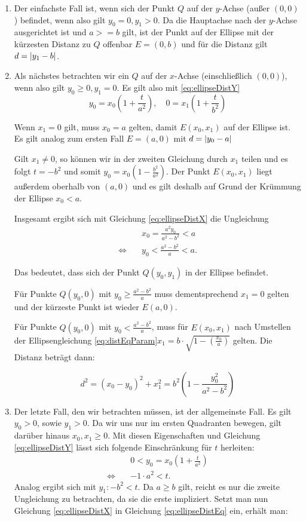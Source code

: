 \begin{enumerate}
	\item Der einfachste Fall ist, wenn sich der Punkt $Q$ auf der $y$-Achse (außer $(0,0)$) befindet, wenn also gilt $y_0 = 0, y_1 > 0$.
	Da die Hauptachse nach der $y$-Achse ausgerichtet ist und $a >= b$ gilt, ist der Punkt auf der Ellipse mit der kürzesten Distanz zu $Q$ offenbar $E = (0, b)$ und für die Distanz gilt $d = \lvert y_1 - b\rvert$.
	\item Als nächstes betrachten wir ein $Q$ auf der $x$-Achse (einschließlich $(0,0)$), wenn also gilt  $y_0 \geq 0, y_1 = 0$. Es gilt also mit \ref{eq:ellipseDistY}
	\[
		y_0 = x_0\left(1 + \frac{t}{a^2}\right), \quad 0 = x_1\left(1 + \frac{t}{b^2}\right)
	\]

	Wenn $x_1 = 0$ gilt, muss $x_0 = a$ gelten, damit $E(x_0,x_1)$ auf der Ellipse ist. Es  gilt analog zum ersten Fall $E=(a,0)$ mit $d = \lvert y_0 - a\rvert$

	Gilt $x_1 \neq 0$, so können wir in der zweiten Gleichung durch $x_1$ teilen und es folgt $t = -b^2$ und somit $y_0 = x_0\left(1 - \frac{b^2}{a^2}\right)$. Der Punkt $E(x_0,x_1)$ liegt außerdem oberhalb von $(a,0)$ und es gilt deshalb auf Grund der Krümmung der Ellipse $x_0 < a$.

	Insgesamt ergibt sich mit Gleichung \ref{eq:ellipseDistX} die Ungleichung
	\[
	\begin{aligned}
		&x_0 = \frac{a^2y_0}{a^2 - b^2} < a \\
		\Leftrightarrow\quad &y_0 < \frac{a^2 - b^2}{a} < a.
	\end{aligned}
	\]

	Das bedeutet, dass sich der Punkt $Q(y_0,y_1)$ in der Ellipse befindet.

	Für Punkte $Q(y_0,0)$ mit $y_0 \geq \frac{a^2 - b^2}{a}$ muss dementsprechend $x_1 = 0$ gelten und der kürzeste Punkt ist wieder $E(a,0)$.

	Für Punkte $Q(y_0,0)$ mit $y_0 < \frac{a^2 - b^2}{a}$, muss für $E(x_0,x_1)$ nach Umstellen der Ellipsengleichung \ref{eq:distEqParam}\quad$x_1 = b\cdot\sqrt{1-\left(\frac{x_0}{a}\right)}$ gelten.
	Die Distanz beträgt dann:

	\[
		d^2 = (x_0 - y_0)^2 + x_1^2 = b^2\left(1 - \frac{y_0^2}{a^2 - b^2}\right)
	\]
	\item Der letzte Fall, den wir betrachten müssen, ist der allgemeinste Fall. Es gilt $y_0 > 0$, sowie $y_1 > 0$. Da wir uns nur im ersten Quadranten bewegen, gilt darüber hinaus $x_0, x_1 \geq 0$. Mit diesen Eigenschaften und Gleichung \ref{eq:ellipseDistY} lässt sich folgende Einschränkung für $t$ herleiten:
\[
	\begin{aligned}
	& 0 < y_0 = x_0\left(1 + \frac{t}{a^2}\right)\\
	\Leftrightarrow\quad& -1\cdot a^2 < t.
	\end{aligned}
\]
	Analog ergibt sich mit $y_1\colon -b^2 < t$. Da $a\geq b$ gilt, reicht es nur die zweite Ungleichung zu betrachten, da sie die erste impliziert. Setzt man nun Gleichung \ref{eq:ellipseDistX} in Gleichung \ref{eq:ellipseDistEq} ein, erhält man:


\end{enumerate}
